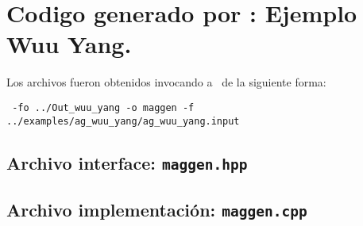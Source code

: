 \section{Codigo generado por \maggen: Ejemplo Wuu Yang.}
\label{append:agwuuyangcode}
Los archivos fueron obtenidos invocando a \maggen\ de la siguiente forma:
\begin{center}
\texttt{\maggen\ -fo ../Out\_wuu\_yang -o maggen -f  ../examples/ag\_wuu\_yang/ag\_wuu\_yang.input}
\end{center}

\subsection*{Archivo interface: \texttt{maggen.hpp}}
\tiny

\subsection*{Archivo implementación: \texttt{maggen.cpp}}
\tiny


\normalsize